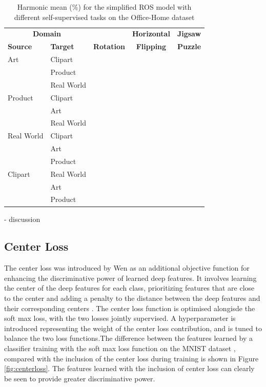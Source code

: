 \documentclass[10pt,twocolumn,letterpaper]{article}
\begin{document}
\begin{table}[!htb]
\small
  \centering
  \begin{tabular}{@{}|ll|ccc|@{}}
    \hline
\multicolumn{2}{|c|}{\textbf{Domain}} & & \textbf{Horizontal} & \textbf{Jigsaw} \\
\textbf{Source} & \textbf{Target} & \textbf{Rotation} & \textbf{Flipping} & \textbf{Puzzle} \\ \hline
Art & Clipart & &  &  \\
& Product & & & \\
 & Real World & & & \\ \hline
Product & Clipart & & & \\
& Art & & & \\
& Real World & & & \\ \hline
Real World & Clipart & & & \\
 & Art & & & \\
 & Product & & & \\ \hline
Clipart & Real World & & & \\
 & Art & & & \\
& Product & & & \\
    \hline
  \end{tabular}
  \caption{Harmonic mean (\%) for the simplified ROS model with different self-supervised tasks on the Office-Home dataset}
  \label{tab:selfs}
\end{table}


- discussion

\subsection{Center Loss}

The center loss was introduced by Wen \etal \cite{Wen2016} as an additional objective function for enhancing the discriminative power of learned deep features. It involves learning the center of the deep features for each class, prioritizing features that are close to the center and adding a penalty to the distance between the deep features and their corresponding centers \cite{Wen2016}. The center loss function is optimised alongisde the soft max loss, with the two losses jointly supervised. A hyperparameter is introduced representing the weight of the center loss contribution, and is tuned to balance the two loss functions.The difference between the features learned by a classifier training with the soft max loss function on the MNIST dataset \cite{MNIST}, compared with the inclusion of the center loss during training is shown in Figure \ref{fig:centerloss}. The features learned with the inclusion of center loss can clearly be seen to provide greater discriminative power.
\end{document}

